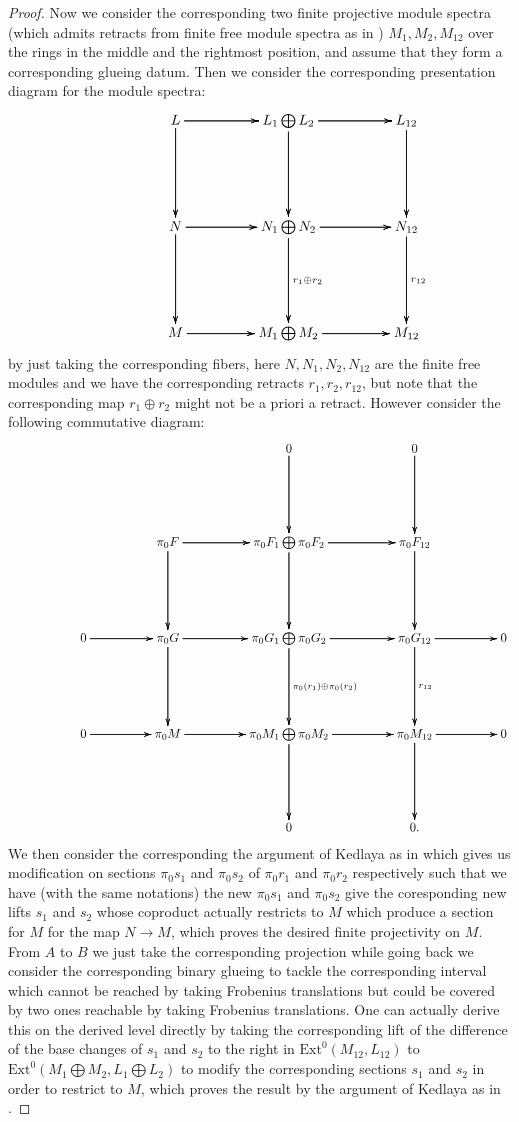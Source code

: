 \documentclass[12pt]{amsart}
\theoremstyle{definition}
\numberwithin{equation}{section}
\begin{document}
\begin{proof}
Now we consider the corresponding two finite projective module spectra (which admits retracts from finite free module spectra as in \cite[Proposition 7.2.2.7]{Lu1}) $M_1,M_2,M_{12}$ over the rings in the middle and the rightmost position, and assume that they form a corresponding glueing datum. Then we consider the corresponding presentation diagram for the module spectra:
\[
\xymatrix@C+2pc@R+3pc{
 &L \ar[r] \ar[r] \ar[r] \ar[d] \ar[d] \ar[d] &L_1\bigoplus L_2 \ar[d] \ar[d] \ar[d] \ar[r] \ar[r] \ar[r] &L_{12} \ar[d] \ar[d] \ar[d] \\
&N \ar[r] \ar[r] \ar[r] \ar[d] \ar[d] \ar[d] &N_1\bigoplus N_2 \ar[d]^{r_1\oplus r_2} \ar[d] \ar[d] \ar[r] \ar[r] \ar[r] &N_{12} \ar[d]^{r_{12}} \ar[d] \ar[d] \\
&M \ar[r] \ar[r] \ar[r] &M_1\bigoplus M_2 \ar[r] \ar[r] \ar[r] &M_{12} \\
}
\]  
by just taking the corresponding fibers, here $N,N_1,N_2,N_{12}$ are the finite free modules and we have the corresponding retracts $r_1,r_2,r_{12}$, but note that the corresponding map $r_1\oplus r_2$ might not be a priori a retract. However consider the following commutative diagram:
\[
\xymatrix@C+2pc@R+3pc{
&& &0 \ar[d] \ar[d] \ar[d] &0 \ar[d] \ar[d] \ar[d] \\
& &\pi_0 F \ar[r] \ar[r] \ar[r] \ar[d] \ar[d] \ar[d] &\pi_0F_1\bigoplus \pi_0F_2 \ar[d] \ar[d] \ar[d] \ar[r] \ar[r] \ar[r] &\pi_0F_{12} \ar[d] \ar[d] \ar[d] \\
&0 \ar[r] \ar[r] \ar[r] &\pi_0G \ar[r] \ar[r] \ar[r] \ar[d] \ar[d] \ar[d] &\pi_0G_1\bigoplus \pi_0G_2 \ar[d]^{\pi_0(r_1)\oplus \pi_0(r_2)} \ar[d] \ar[d] \ar[r] \ar[r] \ar[r] &\pi_0G_{12} \ar[d]^{r_{12}} \ar[d] \ar[d] \ar[r] \ar[r] \ar[r]&0 \\
&0 \ar[r] \ar[r] \ar[r] &\pi_0M \ar[r] \ar[r] \ar[r] &\pi_0M_1\bigoplus \pi_0M_2\ar[d] \ar[d] \ar[d]  \ar[r] \ar[r] \ar[r] &\pi_0M_{12}\ar[d] \ar[d] \ar[d]  \ar[r] \ar[r] \ar[r]&0 \\
&&&0&0.
}
\] 
We then consider the corresponding the argument of Kedlaya as in \cite[Proposition 5.11]{XT3} which gives us modification on sections $\pi_0s_1$ and $\pi_0 s_2$ of $\pi_0 r_1$ and $\pi_0 r_2$ respectively such that we have (with the same notations) the new $\pi_0 s_1$ and $\pi_0 s_2$ give the coresponding new lifts $s_1$ and $s_2$ whose coproduct actually restricts to $M$ which produce a section for $M$ for the map $N\rightarrow M$, which proves the desired finite projectivity on $M$. From $A$ to $B$ we just take the corresponding projection while going back we consider the corresponding binary glueing to tackle the corresponding interval which cannot be reached by taking Frobenius translations but could be covered by two ones reachable by taking Frobenius translations.
One can actually derive this on the derived level directly by taking the corresponding lift of the difference of the base changes of $s_1$ and $s_2$ to the right in $\mathrm{Ext}^0(M_{12},L_{12})$ to $\mathrm{Ext}^0(M_1\bigoplus M_2,L_1\bigoplus L_2)$ to modify the corresponding sections $s_1$ and $s_2$ in order to restrict to $M$, which proves the result by the argument of Kedlaya as in \cite[Proposition 5.11]{XT3}.
\end{proof}
\end{document}
